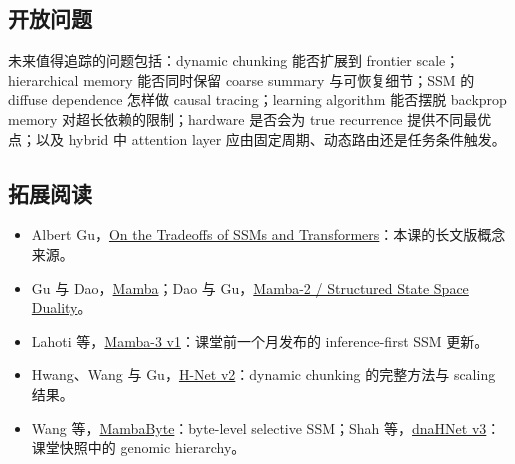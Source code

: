 \documentclass[a4paper]{article}
\begin{document}
\subsection{开放问题}

未来值得追踪的问题包括：dynamic chunking 能否扩展到 frontier scale；hierarchical memory 能否同时保留 coarse summary 与可恢复细节；SSM 的 diffuse dependence 怎样做 causal tracing；learning algorithm 能否摆脱 backprop memory 对超长依赖的限制；hardware 是否会为 true recurrence 提供不同最优点；以及 hybrid 中 attention layer 应由固定周期、动态路由还是任务条件触发。

\subsection{拓展阅读}

\begin{itemize}
  \item Albert Gu，\href{https://goombalab.github.io/blog/2025/tradeoffs/}{On the Tradeoffs of SSMs and Transformers}：本课的长文版概念来源。
  \item Gu 与 Dao，\href{https://arxiv.org/abs/2312.00752}{Mamba}；Dao 与 Gu，\href{https://arxiv.org/abs/2405.21060}{Mamba-2 / Structured State Space Duality}。
  \item Lahoti 等，\href{https://arxiv.org/abs/2603.15569v1}{Mamba-3 v1}：课堂前一个月发布的 inference-first SSM 更新。
  \item Hwang、Wang 与 Gu，\href{https://arxiv.org/abs/2507.07955v2}{H-Net v2}：dynamic chunking 的完整方法与 scaling 结果。
  \item Wang 等，\href{https://arxiv.org/abs/2401.13660}{MambaByte}：byte-level selective SSM；Shah 等，\href{https://arxiv.org/abs/2602.10603v3}{dnaHNet v3}：课堂快照中的 genomic hierarchy。
\end{itemize}
\end{document}
